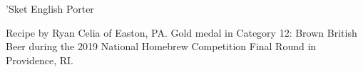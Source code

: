 \begin{recipe}{'Sket English Porter} %

\begin{aboutblock}
Recipe by Ryan Celia of Easton, PA. Gold medal in Category 12: Brown British
Beer during the 2019 National Homebrew Competition Final Round in Providence, RI.
\sourceaha
\end{aboutblock}


\begin{methodandtiming}
 
\begin{mashsteps}
\end{mashsteps}

\begin{fermentationsteps}
\end{fermentationsteps}

\end{methodandtiming}

\recipebreak

\begin{ingredientsblock}

\begin{malts}
\end{malts}

\begin{hops}
\end{hops}


\end{ingredientsblock}

\end{recipe}
